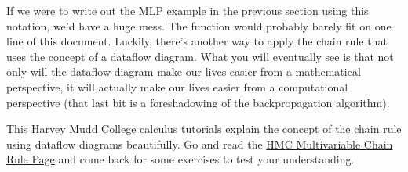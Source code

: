 \documentclass[assignment06_Solutions]{subfiles}
\begin{document}
If we were to write out the MLP example in the previous section using this notation, we'd have a huge mess.  The function would probably barely fit on one line of this document.  Luckily, there's another way to apply the chain rule that uses the concept of a dataflow diagram.  What you will eventually see is that not only will the dataflow diagram make our lives easier from a mathematical perspective, it will actually make our lives easier from a computational perspective (that last bit is a foreshadowing of the backpropagation algorithm).


\begin{externalresources}[(20 minutes)]
This Harvey Mudd College calculus tutorials explain the concept of the chain rule using dataflow diagrams beautifully.  Go and read the \href{https://math.hmc.edu/calculus/hmc-mathematics-calculus-online-tutorials/multivariable-calculus/multi-variable-chain-rule/}{HMC Multivariable Chain Rule Page} and come back for some exercises to test your understanding.
\end{externalresources}
\end{document}
